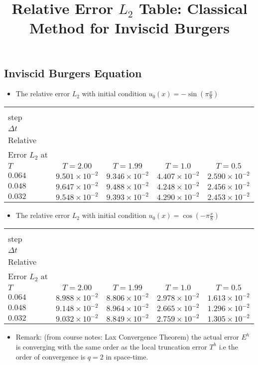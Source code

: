 \documentclass[12pt]{article}
\begin{document}
\title{Relative Error $L_{2}$ Table: Classical Method for Inviscid Burgers}
\author{}
\date{}

\maketitle



\subsection{Inviscid Burgers Equation}

\begin{itemize}
    \item The relative error $L_{2}$ with initial condition $u_{0}(x) = -\sin(\pi \frac{x}{8})$
\end{itemize}

\centering
\begin{tabular}{|l|c|c|c|c|   }\hline
\diagbox[width=9em]{Time\\step\\$\Delta t$}{\\Relative\\Error $L_{2}$ at\\$T$ }&
  $T=2.00$ & $T=1.99$ & $T=1.0$ & $T=0.5$ \\ \hline
 $0.064$ & $9.501 \times 10^{-2}$ & $9.346 \times 10^{-2}$ & $4.407 \times 10^{-2}$ & $2.590 \times 10^{-2}$ \\ \hline
 $0.048$ & $9.647 \times 10^{-2}$ & $9.488 \times 10^{-2}$ & $4.248 \times 10^{-2}$ & $2.456 \times 10^{-2}$ \\ \hline
 $0.032$ & $9.548 \times 10^{-2}$ & $9.393 \times 10^{-2}$ & $4.290 \times 10^{-2}$ & $2.453 \times 10^{-2}$ \\ \hline
\end{tabular}



\begin{itemize}
    \item The relative error $L_{2}$ with initial condition $u_{0}(x) = \cos(-\pi \frac{x}{8})$
\end{itemize}

\centering
\begin{tabular}{|l|c|c|c|c|   }\hline
\diagbox[width=9em]{Time\\step\\$\Delta t$}{\\Relative\\Error $L_{2}$ at\\$T$ }&
  $T=2.00$ & $T=1.99$ & $T=1.0$ & $T=0.5$ \\ \hline
 $0.064$ & $8.988 \times 10^{-2}$ & $8.806 \times 10^{-2}$ & $2.978 \times 10^{-2}$ & $1.613 \times 10^{-2}$ \\ \hline
 $0.048$ & $9.148 \times 10^{-2}$ & $8.964 \times 10^{-2}$ & $2.665 \times 10^{-2}$ & $1.296 \times 10^{-2}$ \\ \hline
 $0.032$ & $9.032 \times 10^{-2}$ & $8.849 \times 10^{-2}$ & $2.759 \times 10^{-2}$ & $1.305 \times 10^{-2}$ \\ \hline
\end{tabular}


\begin{itemize}
    \item Remark: (from course notes: Lax Convergence Theorem) the actual error $E^{h}$ is converging with the same order as the local truncation error $T^{h}$ i.e the order of convergence is $q=2$ in space-time. 
\end{itemize}
\end{document}
